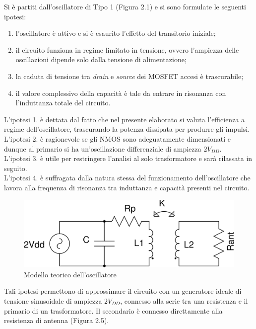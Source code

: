 \documentclass[a4paper, 12pt]{memoir}
\begin{document}
Si è partiti dall'oscillatore di Tipo 1 (Figura 2.1) e si sono formulate le
seguenti ipotesi:
\begin{enumerate}
\item l'oscillatore è attivo e si è esaurito l'effetto del transitorio
	iniziale;
\item il circuito funziona in regime limitato in tensione, ovvero l'ampiezza
	delle oscillazioni dipende solo dalla tensione di alimentazione;
\item la caduta di tensione tra \emph{drain} e \emph{source} dei MOSFET accesi
	è trascurabile;
\item il valore complessivo della capacità è tale da entrare in risonanza con
	l'induttanza totale del circuito.
\end{enumerate}
L'ipotesi 1. è dettata dal fatto che nel presente elaborato si valuta 
l'efficienza a regime dell'oscillatore, trascurando la potenza dissipata per
produrre gli impulsi.\\
L'ipotesi 2. è ragionevole se gli NMOS sono adeguatamente dimensionati e dunque
al primario si ha un'oscillazione differenziale di ampiezza $2V_{DD}$.\\
L'ipotesi 3. è utile per restringere l'analisi al solo trasformatore e sarà
rilassata in seguito.\\
L'ipotesi 4. è suffragata dalla natura stessa del funzionamento 
dell'oscillatore che lavora alla frequenza di risonanza tra induttanza e
capacità presenti nel circuito.
\begin{figure}[h!]
\centering
\includegraphics[height=0.12\textheight]{images/cir_model.pdf}
\caption{Modello teorico dell'oscillatore}
\end{figure}

Tali ipotesi permettono di approssimare il circuito con un generatore
ideale di tensione sinusoidale di ampiezza $2V_{DD}$, connesso alla serie tra
una resistenza e il primario di un trasformatore. Il secondario è connesso
direttamente alla resistenza di antenna (Figura 2.5).
\end{document}

